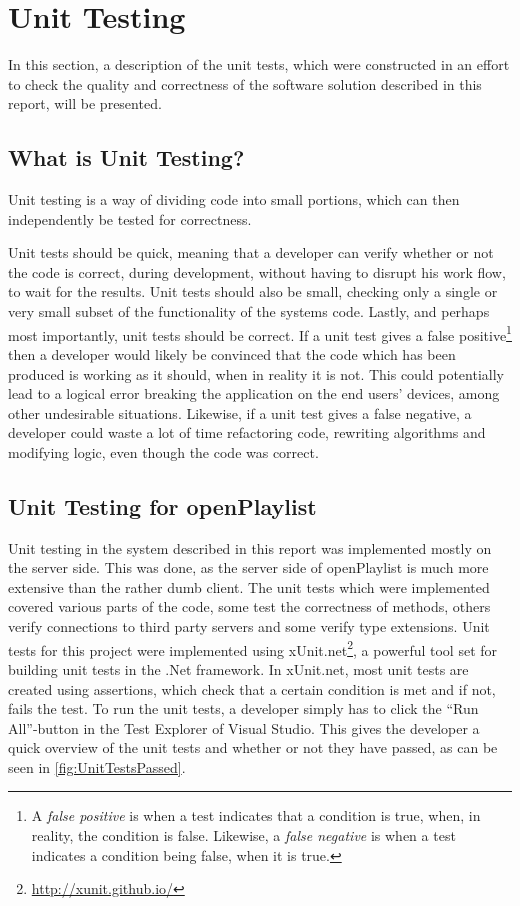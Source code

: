 \section{Unit Testing}
\label{unitTesting}
In this section, a description of the unit tests, which were constructed in an effort to check the quality and correctness of the software solution described in this report, will be presented.

\subsection{What is Unit Testing?}
Unit testing is a way of dividing code into small portions, which can then independently be tested for correctness\cite{unittesting}.

Unit tests should be quick, meaning that a developer can verify whether or not the code is correct, during development, without having to disrupt his work flow, to wait for the results.
Unit tests should also be small, checking only a single or very small subset of the functionality of the systems code.
Lastly, and perhaps most importantly, unit tests should be correct. If a unit test gives a false positive\footnote{A \emph{false positive} is when a test indicates that a condition is true, when, in reality, the condition is false. Likewise, a \emph{false negative} is when a test indicates a condition being false, when it is true.} then a developer would likely be convinced that the code which has been produced is working as it should, when in reality it is not. This could potentially lead to a logical error breaking the application on the end users' devices, among other undesirable situations. Likewise, if a unit test gives a false negative, a developer could waste a lot of time refactoring code, rewriting algorithms and modifying logic, even though the code was correct.

\subsection{Unit Testing for openPlaylist}
Unit testing in the system described in this report was implemented mostly on the server side. This was done, as the server side of openPlaylist is much more extensive than the rather dumb client.
The unit tests which were implemented covered various parts of the code, some test the correctness of methods, others verify connections to third party servers and some verify type extensions.
Unit tests for this project were implemented using xUnit.net\footnote{\url{http://xunit.github.io/}}, a powerful tool set for building unit tests in the .Net framework. In xUnit.net, most unit tests are created using assertions, which check that a certain condition is met and if not, fails the test.
To run the unit tests, a developer simply has to click the \enquote{Run All}-button in the Test Explorer of Visual Studio. This gives the developer a quick overview of the unit tests and whether or not they have passed, as can be seen in \cref{fig:UnitTestsPassed}.

